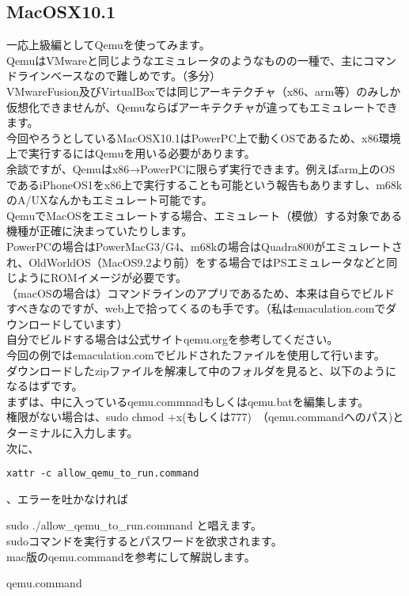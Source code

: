 \documentclass[b5paper,10pt]{jsarticle}
\begin{document}
\begin{multicols*}{3}
\subsection{MacOSX10.1}
一応上級編としてQemuを使ってみます。\\
QemuはVMwareと同じようなエミュレータのようなものの一種で、主にコマンドラインベースなので難しめです。（多分）\\
VMwareFusion及びVirtualBoxでは同じアーキテクチャ（x86、arm等）のみしか仮想化できませんが、Qemuならばアーキテクチャが違ってもエミュレートできます。\\
今回やろうとしているMacOSX10.1はPowerPC上で動くOSであるため、x86環境上で実行するにはQemuを用いる必要があります。\\
余談ですが、Qemuはx86→PowerPCに限らず実行できます。例えばarm上のOSであるiPhoneOS1をx86上で実行することも可能という報告もありますし、m68kのA/UXなんかもエミュレート可能です。\\
QemuでMacOSをエミュレートする場合、エミュレート（模倣）する対象である機種が正確に決まっていたりします。\\
PowerPCの場合はPowerMacG3/G4、m68kの場合はQuadra800がエミュレートされ、OldWorldOS（MacOS9.2より前）をする場合ではPSエミュレータなどと同じようにROMイメージが必要です。\\
（macOSの場合は）コマンドラインのアプリであるため、本来は自らでビルドすべきなのですが、web上で拾ってくるのも手です。（私はemaculation.comでダウンロードしています）\\
自分でビルドする場合は公式サイトqemu.orgを参考してください。\\
今回の例ではemaculation.comでビルドされたファイルを使用して行います。\\
ダウンロードしたzipファイルを解凍して中のフォルダを見ると、以下のようになるはずです。\\
まずは、中に入っているqemu.commnadもしくはqemu.batを編集します。\\
権限がない場合は、sudo chmod +x(もしくは777)　（qemu.commandへのパス)とターミナルに入力します。\\
次に、
\begin{lstlisting}[caption=Sample]
xattr -c allow_qemu_to_run.command 
\end{lstlisting}
、エラーを吐かなければ
\begin{lstlistng}[saitama]
sudo ./allow_qemu_to_run.command
と唱えます。\\
sudoコマンドを実行するとパスワードを欲求されます。\\
mac版のqemu.commandを参考にして解説します。\\
\begin{itembox}{qemu.command}


\end{itembox}
\end{lstlistng}
\end{multicols*}
\end{document}
